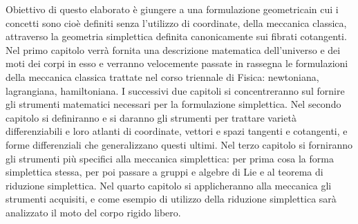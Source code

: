 Obiettivo di questo elaborato è giungere a una formulazione geometricain cui i concetti sono cioè definiti senza l'utilizzo di coordinate, della meccanica classica, attraverso la geometria simplettica definita canonicamente sui fibrati cotangenti. Nel primo capitolo verrà fornita una descrizione matematica dell'universo e dei moti dei corpi in esso e verranno velocemente passate in rassegna le formulazioni della meccanica classica trattate nel corso triennale di Fisica: newtoniana, lagrangiana, hamiltoniana. I successivi due capitoli si concentreranno sul fornire gli strumenti matematici necessari per la formulazione simplettica. Nel secondo capitolo si definiranno e si daranno gli strumenti per trattare varietà differenziabili e loro atlanti di coordinate, vettori e spazi tangenti e cotangenti, e forme differenziali che generalizzano questi ultimi. Nel terzo capitolo si forniranno gli strumenti più specifici alla meccanica simplettica: per prima cosa la forma simplettica stessa, per poi passare a gruppi e algebre di Lie e al teorema di riduzione simplettica. Nel quarto capitolo si applicheranno alla meccanica gli strumenti acquisiti, e come esempio di utilizzo della riduzione simplettica sarà analizzato il moto del corpo rigido libero.